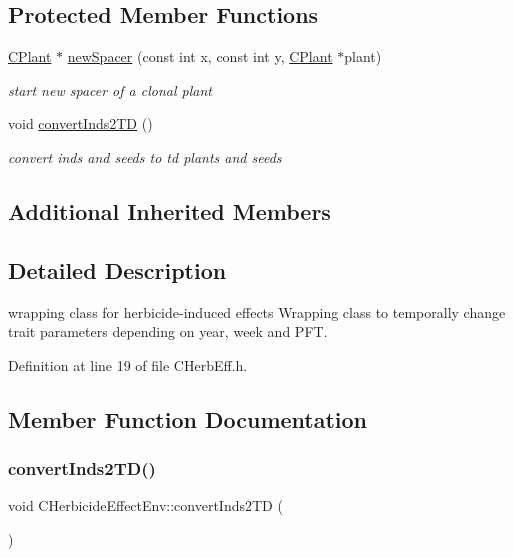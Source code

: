 \subsection*{Protected Member Functions}
\begin{DoxyCompactItemize}
\item 
\mbox{\hyperlink{class_c_plant}{C\+Plant}} $\ast$ \mbox{\hyperlink{class_c_herbicide_effect_env_ae76943414d4aeded838e98dea916084d}{new\+Spacer}} (const int x, const int y, \mbox{\hyperlink{class_c_plant}{C\+Plant}} $\ast$plant)
\begin{DoxyCompactList}\small\item\em start new spacer of a clonal plant \end{DoxyCompactList}\item 
void \mbox{\hyperlink{class_c_herbicide_effect_env_a96c854b6a445c32ba2780ed0869b5e17}{convert\+Inds2\+TD}} ()
\begin{DoxyCompactList}\small\item\em convert inds and seeds to td plants and seeds \end{DoxyCompactList}\end{DoxyCompactItemize}
\subsection*{Additional Inherited Members}


\subsection{Detailed Description}
wrapping class for herbicide-\/induced effects Wrapping class to temporally change trait parameters depending on year, week and P\+FT. 

Definition at line 19 of file C\+Herb\+Eff.\+h.



\subsection{Member Function Documentation}
\mbox{\label{class_c_herbicide_effect_env_a96c854b6a445c32ba2780ed0869b5e17}} 
\subsubsection{\texorpdfstring{convertInds2TD()}{convertInds2TD()}}
{\footnotesize\ttfamily void C\+Herbicide\+Effect\+Env\+::convert\+Inds2\+TD (\begin{DoxyParamCaption}{ }\end{DoxyParamCaption})\hspace{0.3cm}{\ttfamily [protected]}}



